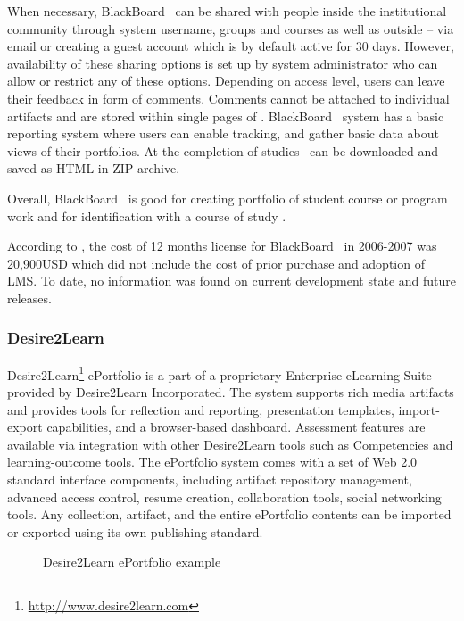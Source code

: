 When necessary, BlackBoard \ep~can be shared with people inside the
institutional community through system username, groups and courses as well as
outside -- via email or creating a guest account which is by default active for
30 days. However, availability of these sharing options is set up by system
administrator who can allow or restrict any of these options. Depending on
access level, users can leave their feedback in form of comments. Comments
cannot be attached to individual artifacts and are stored within single pages of
\ep. BlackBoard \ep~system has a basic reporting system where users can enable
tracking, and gather basic data about views of their portfolios. At the
completion of studies \ep~can be downloaded and saved as HTML in ZIP archive.

Overall, BlackBoard \ep~is good for creating portfolio of student course or
program work and for identification with a course of study
\citep{UniversityofTorontoScarborough2010}. 

According to \citet{Sweat-Guy2007}, the cost of 12 months license for
BlackBoard \ep~in 2006-2007 was 20,900USD which did not include the cost of
prior purchase and adoption of LMS. To date, no information was found on current
development state and future releases.

\subsubsection{Desire2Learn}
Desire2Learn\footnote{\url{http://www.desire2learn.com}} ePortfolio is a part of
a proprietary Enterprise eLearning Suite provided by Desire2Learn Incorporated.
The system supports rich media artifacts and provides tools for reflection and
reporting, presentation templates, import-export capabilities, and a
browser-based dashboard. Assessment features are available via integration with
other Desire2Learn tools such as Competencies and learning-outcome tools. The
ePortfolio system comes with a set of Web 2.0 standard interface components,
including artifact repository management, advanced access control, resume
creation, collaboration tools, social networking tools. Any collection,
artifact, and the entire ePortfolio contents can be imported or exported using
its own publishing standard.

\begin{figure}[htb]
\centering
\setlength\fboxsep{0pt}
\setlength\fboxrule{0.5pt}
\fbox{\texttt{[image: CH4-F7-D2L]}}
\caption[Desire2Learn ePortfolio example]{Desire2Learn ePortfolio example
\citep{Desire2LearnIncorporated2011}}
\label{fig:d2ep}
\end{figure}
 
